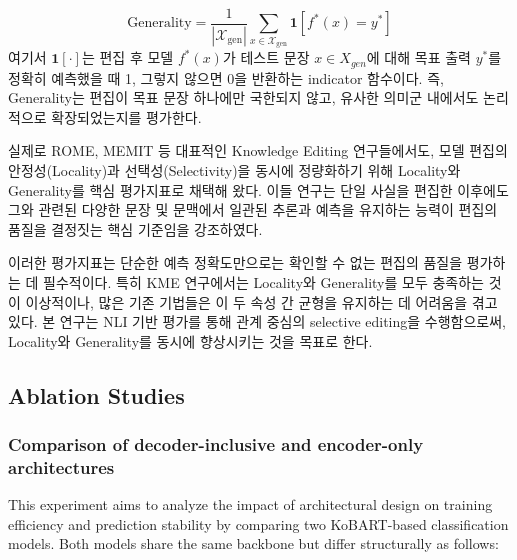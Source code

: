 \documentclass[a4paper,fleqn]{cas-sc}
\begin{document}
\begin{equation}
\text{Generality} = \frac{1}{\left| \mathcal{X}_{\text{gen}} \right|} \sum_{x \in \mathcal{X}_{\text{gen}}} \mathbf{1} \left[ f^*(x) = y^* \right]
\label{eq:generality}
\end{equation}
\noindent
여기서 $\mathbf{1}[\cdot]$는 편집 후 모델 $f^*(x)$가 테스트 문장 $x \in X_{gen}$​에 대해 목표 출력 $y^*$를 정확히 예측했을 때 1, 그렇지 않으면 0을 반환하는 indicator 함수이다. 즉, Generality는 편집이 목표 문장 하나에만 국한되지 않고, 유사한 의미군 내에서도 논리적으로 확장되었는지를 평가한다.


실제로 ROME, MEMIT 등 대표적인 Knowledge Editing 연구들에서도, 모델 편집의 안정성(Locality)과 선택성(Selectivity)을 동시에 정량화하기 위해 Locality와 Generality를 핵심 평가지표로 채택해 왔다. 이들 연구는 단일 사실을 편집한 이후에도 그와 관련된 다양한 문장 및 문맥에서 일관된 추론과 예측을 유지하는 능력이 편집의 품질을 결정짓는 핵심 기준임을 강조하였다.

이러한 평가지표는 단순한 예측 정확도만으로는 확인할 수 없는 편집의 품질을 평가하는 데 필수적이다. 특히 KME 연구에서는 Locality와 Generality를 모두 충족하는 것이 이상적이나, 많은 기존 기법들은 이 두 속성 간 균형을 유지하는 데 어려움을 겪고 있다. 본 연구는 NLI 기반 평가를 통해 관계 중심의 selective editing을 수행함으로써, Locality와 Generality를 동시에 향상시키는 것을 목표로 한다.



\subsection{Ablation Studies}

\subsubsection{Comparison of decoder-inclusive and encoder-only architectures}

This experiment aims to analyze the impact of architectural design on training efficiency and prediction stability by comparing two KoBART-based classification models. Both models share the same backbone but differ structurally as follows:
\end{document}
